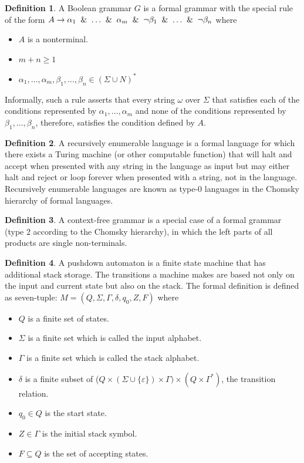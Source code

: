 \documentclass[conference]{IEEEtran}
\theoremstyle{definition}
\newtheorem{defn}{Definition}[section]
\begin{document}
\begin{defn}
A Boolean grammar $G$ is a formal grammar with the special rule of the form 
$\\A\to \alpha_{1}\And \ldots \And \alpha_{m}\And \lnot \beta_{1}\And \ldots \And \lnot \beta_{n}$ where 
\begin{itemize}
    \item $A$ is a nonterminal.
    \item $m+n\geq 1$
    \item $\alpha_{1}, \dots, \alpha_{m}, \beta_{1}, \dots, \beta_{n} \in (\Sigma \cup N)^*$
\end{itemize}
Informally, such a rule asserts that every string $\omega$ over $\Sigma$ 
that satisfies each of the conditions represented by $\alpha_{1}, \dots, \alpha_{m}$
and none of the conditions represented by $\beta_{1}, \dots, \beta_{n}$, 
therefore, satisfies the condition defined by $A$.
\end{defn}

\begin{defn}
A recursively enumerable language is a formal language for which there exists a Turing machine 
(or other computable function) that will halt and accept when presented with any string 
in the language as input but may either halt and reject or loop forever when presented 
with a string, not in the language. Recursively enumerable languages are known as type-0 
languages in the Chomsky hierarchy of formal languages.
\end{defn}

\begin{defn}
A context-free grammar is a special case of a formal grammar 
(type 2 according to the Chomsky hierarchy), in which the left parts of all 
products are single non-terminals.
\end{defn}

\begin{defn}
A pushdown automaton is a finite state machine that has additional stack storage. The transitions a machine makes are based not only on the input and current state but also on the stack. The formal definition is defined as seven-tuple:
$M=(Q,\Sigma ,\Gamma ,\delta ,q_{0},Z,F)$ where
\begin{itemize}
    \item $Q$ is a finite set of states.
    \item $\Sigma$ is a finite set which is called the input alphabet.
    \item $\Gamma$ is a finite set which is called the stack alphabet.
    \item $\delta$ is a finite subset of ($Q \times (\Sigma \cup \{\varepsilon \})\times \Gamma) \times (Q\times \Gamma^{*})$, the transition relation.
    \item $q_{0}\in Q$ is the start state.
    \item $Z\in \Gamma$ is the initial stack symbol.
    \item $F\subseteq Q$ is the set of accepting states.
\end{itemize}
\end{defn}
\end{document}
